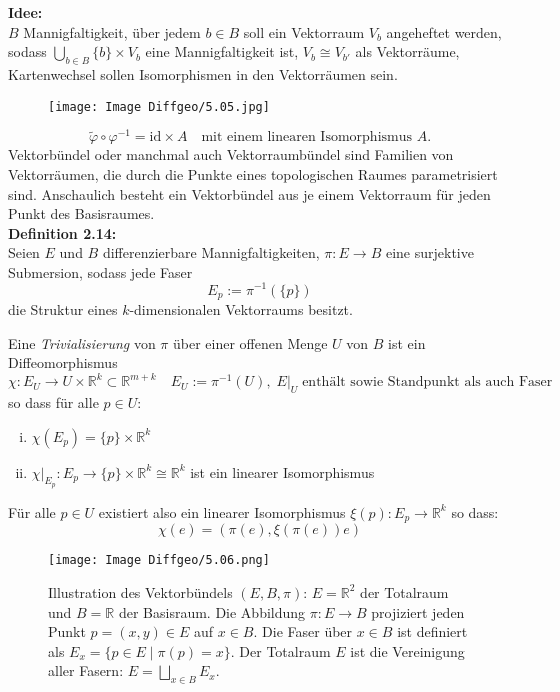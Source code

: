 \documentclass[fleqn, 12pt, letterpaper]{article}
\newcommand{\txt}[1]{\text{#1}}
\begin{document}
\textbf{Idee:} \\
\(B\) Mannigfaltigkeit, über jedem \(b \in B\) soll ein Vektorraum \(V_b\) angeheftet werden, sodass $	\bigcup_{b\in B}\{b\}\times V_b$ eine Mannigfaltigkeit ist,  
\(V_b \cong V_{b'}\) als Vektorräume, Kartenwechsel sollen Isomorphismen in den Vektorräumen sein.
  \begin{figure}[H]
    \centering
    \texttt{[image: Image Diffgeo/5.05.jpg]}
 \end{figure}
\[
\tilde{\varphi} \circ \varphi^{-1} = \mathrm{id} \times A
\quad \text{mit einem linearen Isomorphismus \(A\)}.
\]
Vektorbündel oder manchmal auch Vektorraumbündel sind Familien von Vektorräumen, die durch die Punkte eines topologischen Raumes parametrisiert sind. Anschaulich besteht ein Vektorbündel aus je einem Vektorraum für jeden Punkt des Basisraumes. \\

\textbf{Definition 2.14:} \\
Seien \(E\) und \(B\) differenzierbare Mannigfaltigkeiten, \(\pi: E \to B\) eine surjektive Submersion, sodass jede Faser
\[
E_p :=\pi^{-1}(\{p\})
\]
die Struktur eines \(k\)-dimensionalen Vektorraums besitzt.  

Eine \emph{Trivialisierung} von \(\pi\) über einer offenen Menge \(U\) von \(B\) ist ein Diffeomorphismus
\[
\chi :E_U\longrightarrow U\times \mathbb{R}^k \subset \mathbb{R}^{m+k} \quad E_U := \pi^{-1}(U), \; E|_U \;\txt{enthält sowie Standpunkt als auch Faser}
\]
so dass für alle \(p \in U\):
\begin{enumerate}[i)]
    \item \(\chi(E_p) = \{p\}\times\mathbb{R}^k\)
    \item \(\chi|_{E_p}: E_p \to\{p\}\times\mathbb{R}^k \cong \mathbb{R}^k\) ist ein linearer Isomorphismus
\end{enumerate}

Für alle \(p \in U\) existiert also ein linearer Isomorphismus \(\xi(p):E_p\longrightarrow\mathbb{R}^k\) so dass:
\[
\chi(e) = (\pi(e), \xi(\pi(e))e)
\]
\begin{figure}[H]
  \centering
  \texttt{[image: Image Diffgeo/5.06.png]}
\caption{Illustration des Vektorbündels \((E, B, \pi)\): 
\(E = \mathbb{R}^2\) der Totalraum und \(B = \mathbb{R}\) der Basisraum. Die Abbildung \(\pi \colon E \to B\) projiziert jeden Punkt \(p = (x, y) \in E\) auf \(x \in B\). Die Faser über \(x \in B\) ist definiert als
\(E_x = \{ p \in E \mid \pi(p) = x \}.\)
Der Totalraum \(E\) ist die Vereinigung aller Fasern:
\(
E = \bigsqcup_{x \in B} E_x.
\)
}
\end{figure}
\end{document}
